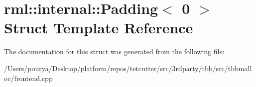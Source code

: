 \hypertarget{structrml_1_1internal_1_1Padding_3_010_01_4}{}\section{rml\+:\+:internal\+:\+:Padding$<$ 0 $>$ Struct Template Reference}
\label{structrml_1_1internal_1_1Padding_3_010_01_4}


The documentation for this struct was generated from the following file\+:\begin{DoxyCompactItemize}
\item 
/\+Users/pourya/\+Desktop/platform/repos/tetcutter/src/3rdparty/tbb/src/tbbmalloc/frontend.\+cpp\end{DoxyCompactItemize}
